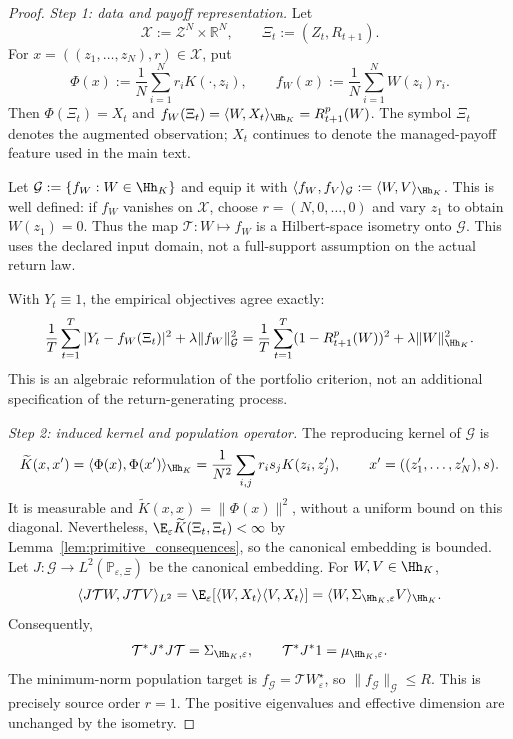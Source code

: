 \begin{proof}
\textit{Step 1: data and payoff representation.}
Let
\[
\mathcal X:=\mathscr Z^N\times\mathbb R^N,
\qquad
\Xi_t:=(Z_t,R_{t+1}).
\]
For $x=((z_1,\ldots,z_N),r)\in\mathcal X$, put
\[
\Phi(x):=\frac1N\sum_{i=1}^N r_iK(\cdot,z_i),
\qquad
f_W(x):=\frac1N\sum_{i=1}^N W(z_i)r_i.
\]
Then $\Phi(\Xi_t)=X_t$ and
$f_W(\Xi_t)=\langle W,X_t\rangle_{\Hh_K}=R^p_{t+1}(W)$.
The symbol $\Xi_t$ denotes the augmented observation; $X_t$ continues to
denote the managed-payoff feature used in the main text.

Let $\mathcal G:=\{f_W:W\in\Hh_K\}$ and equip it with
$\langle f_W,f_V\rangle_{\mathcal G}:=\langle W,V\rangle_{\Hh_K}$.
This is well defined: if $f_W$ vanishes on $\mathcal X$, choose
$r=(N,0,\ldots,0)$ and vary $z_1$ to obtain $W(z_1)=0$.
Thus the map $\mathcal T:W\mapsto f_W$ is a Hilbert-space isometry onto
$\mathcal G$. This uses the declared input domain, not a full-support
assumption on the actual return law.

With $Y_t\equiv1$, the empirical objectives agree exactly:
\[
\frac1T\sum_{t=1}^T|Y_t-f_W(\Xi_t)|^2+\lambda\|f_W\|_{\mathcal G}^2
=
\frac1T\sum_{t=1}^T(1-R^p_{t+1}(W))^2+\lambda\|W\|_{\Hh_K}^2.
\]
This is an algebraic reformulation of the portfolio criterion, not an
additional specification of the return-generating process.

\medskip
\noindent\textit{Step 2: induced kernel and population operator.}
The reproducing kernel of $\mathcal G$ is
\[
\widetilde K(x,x')
=\langle\Phi(x),\Phi(x')\rangle_{\Hh_K}
=\frac1{N^2}\sum_{i,j}r_i s_jK(z_i,z_j'),
\qquad x'=((z_1',\ldots,z_N'),s).
\]
It is measurable and $\widetilde K(x,x)=\|\Phi(x)\|^2$, without a uniform
bound on this diagonal. Nevertheless,
$\E_\varepsilon\widetilde K(\Xi_t,\Xi_t)<\infty$ by
Lemma~\ref{lem:primitive_consequences}, so the canonical embedding is bounded.
Let $J:\mathcal G\to L^2(\mathbb P_{\varepsilon,\Xi})$ be the canonical
embedding. For $W,V\in\Hh_K$,
\[
\langle J\mathcal TW,J\mathcal TV\rangle_{L^2}
=\E_\varepsilon[\langle W,X_t\rangle\langle V,X_t\rangle]
=\langle W,\Sigma_{\Hh_K,\varepsilon}V\rangle_{\Hh_K}.
\]
Consequently,
\[
\mathcal T^*J^*J\mathcal T=\Sigma_{\Hh_K,\varepsilon},
\qquad
\mathcal T^*J^*1=\mu_{\Hh_K,\varepsilon}.
\]
The minimum-norm population target is
$f_{\mathcal G}=\mathcal TW^\star_\varepsilon$, so
$\|f_{\mathcal G}\|_{\mathcal G}\leq R$. This is precisely source order
$r=1$. The positive eigenvalues and effective dimension are unchanged by
the isometry.


\end{proof}
